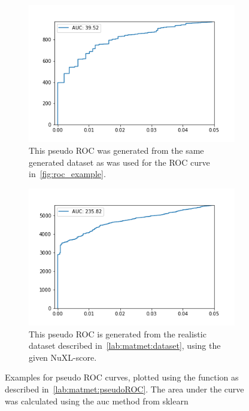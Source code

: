 	\begin{figure}
		\normalsize
		\centering
		\begin{subfigure}{0.49\textwidth}
			\includegraphics[width = \textwidth]{figures/pseudo_ROC_generated_dataset.png}
			\caption{This pseudo ROC was generated from the same generated dataset as was used for the ROC curve in~\ref{fig:roc_example}.}
		\end{subfigure}
		\hfill
		\begin{subfigure}{0.49\textwidth}
			\includegraphics[width = \textwidth]{figures/pseudo_ROC_slow.png}
			\caption{This pseudo ROC is generated from the realistic dataset described in~\ref{lab:matmet:dataset}, using the given NuXL-score.}
		\end{subfigure}
		\caption[Examples for pseudo ROC curves]{Examples for pseudo ROC curves, plotted using the function as described in~\ref{lab:matmet:pseudoROC}. The area under the curve was calculated using the auc method from sklearn~\protect\footnotemark}
		\label{fig:pseudo_roc_example}
	\end{figure}
	\renewcommand{\baselinestretch}{1}
	\\